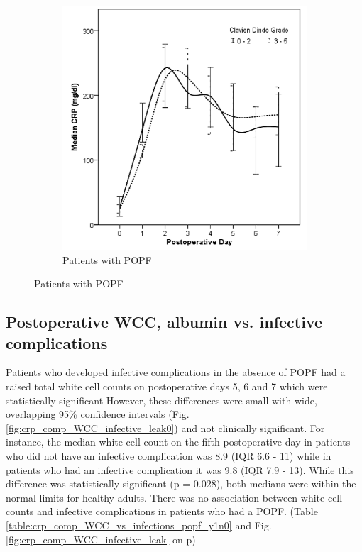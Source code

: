 \begin{figure}[t]
\begin{subfigure}{0.48\textwidth}
		\includegraphics[width=\textwidth]{Figures/crp_comp_infective_leak1}
		\caption{Patients with POPF}
		\label{fig:crp_comp_infective_leak1}
	\end{subfigure}
\end{figure}
\vfill

\clearpage

\subsection{Postoperative WCC, albumin vs. infective complications}

Patients who developed infective complications in the absence of POPF had a raised total white cell counts on postoperative days 5, 6 and 7 which were statistically significant However, these differences were small with wide, overlapping 95\% confidence intervals (Fig. \ref{fig:crp_comp_WCC_infective_leak0}) and not clinically significant. 
For instance, the median white cell count on the fifth postoperative day in patients who did not have an infective complication was 8.9 (IQR 6.6 - 11) while in patients who had an infective complication it was 9.8 (IQR 7.9 - 13). 
While this difference was statistically significant (p = 0.028), both medians were within the normal limits for healthy adults. 
There was no association between white cell counts and infective complications in patients who had a POPF. (Table \ref{table:crp_comp_WCC_vs_infections_popf_y1n0} and Fig. \ref{fig:crp_comp_WCC_infective_leak} on p\pageref{fig:crp_comp_WCC_infective_leak})

